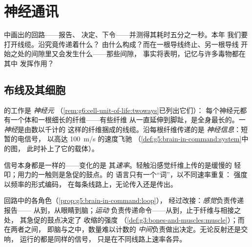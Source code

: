 \chapter{神经通讯}\label{ch:g8:nervous-communication}

中画出的回路——报告、
决定、下令——并测得其耗时五分之一秒。本年
我们要打开线缆。沿究竟传递着什么？
由什么构成？而在一根导线终止、另一根导线
开始之处的间隙里又会发生什么——那些间隙，
事实将表明，记忆与许多毒物都在其中
发挥作用？

\section{布线及其细胞}

\begin{definition}[神经元与神经信息]\label{def:g8:nervous-communication:neuron}
的工作是
\emph{神经元}
（\cref{rem:g6:cell-unit-of-life:twoways}已列出它们）：
每个神经元都有一个体和一根细长的纤维——有些纤维
从一直延伸到脚趾，是全身最长的。一
\emph{神经}是由数以千计的
这样的纤维捆成的线缆。沿每根纤维传递的是
\emph{神经信息}：短暂的电信号，
以高达 \qty{100}{m/s} 的速度飞驰
（\cref{def:g5:brain-in-command:system}中的图，
此时补上了它的载体）。
\end{definition}

\begin{proposition}[按频率编码]\label{prop:g8:nervous-communication:code}
信号本身都是一样的——变化的是
其\emph{速率}。轻触沿感觉纤维上传的是缓慢的
轻叩；用力的一触则是急促的鼓点。的
语言只有一个“词”，以不同速率重复：
强度以频率的形式编码，
在每条线路上，无论传入还是传出。
\end{proposition}
\admitted

\begin{example}\label{ex:g8:nervous-communication:lines}
回路中的各角色（\cref{prop:g5:brain-in-command:loop}），
经过改接：\emph{感觉}负责传递报告——
从到，从眼睛到脑；\emph{运动}
负责传递命令——从到，止于纤维与相接之处，
其急促的鼓点决定了
收缩的强度
（\cref{def:g3:bones-and-muscles:muscle}）；而在两者之间，
即脑与之中，数量难以计数的
\emph{中间}负责做出决定。无论反射还是交响，
运行的都是同样的信号，
只是在不同线路上速率各异。
\end{example}

